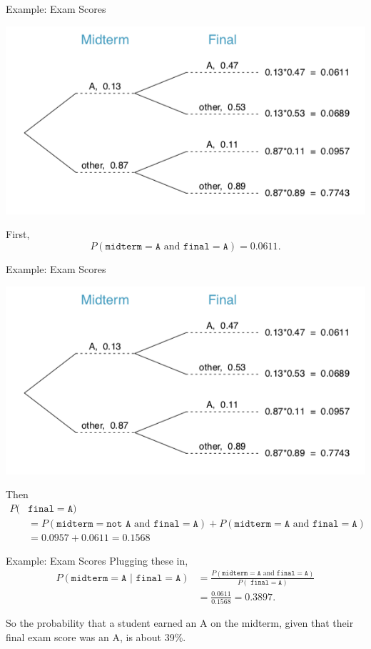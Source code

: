 \begin{frame}{Example: Exam Scores}
    \begin{center}
        \includegraphics[scale=0.4]{images/tree2.png}
    \end{center}
    First,
    \[
    P(\texttt{midterm}=\texttt{A }\text{and}\texttt{ final}=\texttt{A})=0.0611.
    \]
\end{frame}

\begin{frame}{Example: Exam Scores}
    \begin{center}
        \includegraphics[scale=0.4]{images/tree2.png}
    \end{center}
    Then
    \small\begin{align*}
        P(&\texttt{final}=\texttt{A}) \\
        &=P(\texttt{midterm}=\texttt{not A}\text{ and }\texttt{final}=\texttt{A}) +P(\texttt{midterm}=\texttt{A}\text{ and }\texttt{final}=\texttt{A}) \\
        &= 0.0957 + 0.0611 =0.1568
    \end{align*}
\end{frame}

\begin{frame}{Example: Exam Scores}
    Plugging these in,
    \begin{align*}
        P(\texttt{midterm}=\texttt{A }|\texttt{ final}=\texttt{A}) &= \frac{P(\texttt{midterm}=\texttt{A }\text{and}\texttt{ final}=\texttt{A})}{P(\texttt{ final}=\texttt{A})} \\
        &= \frac{0.0611}{0.1568} = 0.3897.
    \end{align*}
    
    \vspace{12pt}So the probability that a student earned an A on the midterm, given that their final exam score was an A, is about 39\%.
\end{frame}

